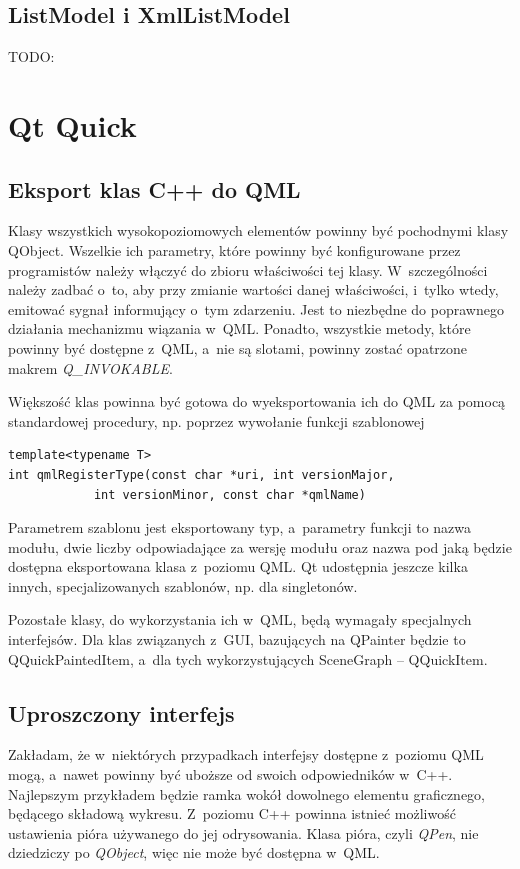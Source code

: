 \subsection{ListModel i XmlListModel}
TODO:


\section{Qt Quick}

\subsection{Eksport klas C++ do QML}
Klasy wszystkich wysokopoziomowych elementów powinny być pochodnymi klasy QObject. Wszelkie ich parametry, które powinny być konfigurowane przez programistów należy włączyć do zbioru właściwości tej klasy. W~szczególności należy zadbać o~to, aby przy zmianie wartości danej właściwości, i~tylko wtedy, emitować sygnał informujący o~tym zdarzeniu. Jest to niezbędne do poprawnego działania mechanizmu wiązania w~QML. Ponadto, wszystkie metody, które powinny być dostępne z~QML, a~nie są slotami, powinny zostać opatrzone makrem \textit{Q\_INVOKABLE}.

Większość klas powinna być gotowa do wyeksportowania ich do QML za pomocą standardowej procedury, np. poprzez wywołanie funkcji szablonowej
\begin{verbatim}
template<typename T>
int qmlRegisterType(const char *uri, int versionMajor, 
		    int versionMinor, const char *qmlName)
\end{verbatim}
Parametrem szablonu jest eksportowany typ, a~parametry funkcji to nazwa modułu, dwie liczby odpowiadające za wersję modułu oraz nazwa pod jaką będzie dostępna eksportowana klasa z~poziomu QML. Qt udostępnia jeszcze kilka innych, specjalizowanych szablonów, np. dla singletonów.

Pozostałe klasy, do wykorzystania ich w~QML, będą wymagały specjalnych interfejsów. Dla klas związanych z~GUI, bazujących na QPainter będzie to QQuickPaintedItem, a~dla tych wykorzystujących SceneGraph -- QQuickItem.

\subsection{Uproszczony interfejs}
Zakładam, że w~niektórych przypadkach interfejsy dostępne z~poziomu QML mogą, a~nawet powinny być uboższe od swoich odpowiedników w~C++. Najlepszym przykładem będzie ramka wokół dowolnego elementu graficznego, będącego składową wykresu. Z~poziomu C++ powinna istnieć możliwość ustawienia pióra używanego do jej odrysowania. Klasa pióra, czyli \textit{QPen}, nie dziedziczy po \textit{QObject}, więc nie może być dostępna w~QML.

